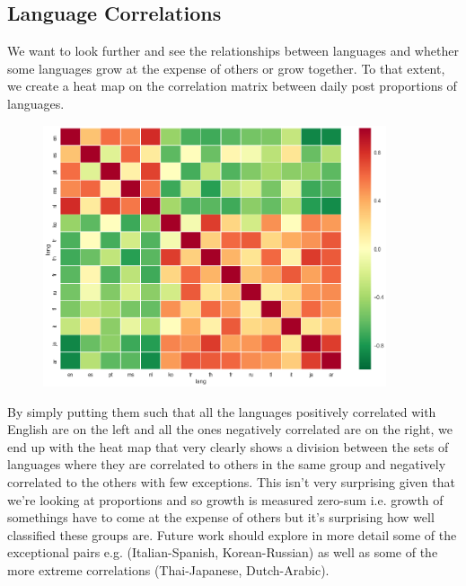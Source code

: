 \documentclass[12pt]{article}
\begin{document}
\subsection{Language Correlations}
We want to look further and see the relationships between languages and whether some languages grow at the expense of others or grow together. To that extent, we create a heat map on the correlation matrix between daily post proportions of languages.
\FloatBarrier
\begin{figure}[hbtp]\centering
\includegraphics[width=0.9\textwidth,clip]{correlation.png}
\end{figure}
\FloatBarrier
By simply putting them such that all the languages positively correlated with English are on the left and all the ones negatively correlated are on the right, we end up with the heat map that very clearly shows a division between the sets of languages where they are correlated to others in the same group and negatively correlated to the others with few exceptions. This isn't very surprising given that we're looking at proportions and so growth is measured zero-sum i.e. growth of somethings have to come at the expense of others but it's surprising how well classified these groups are. Future work should explore in more detail some of the exceptional pairs e.g. (Italian-Spanish, Korean-Russian) as well as some of the more extreme correlations (Thai-Japanese, Dutch-Arabic). 
\end{document}
